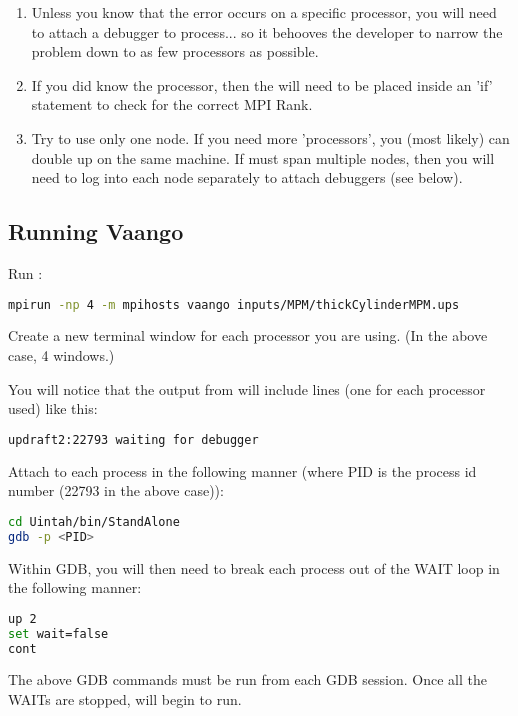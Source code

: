 \begin{enumerate}
 \item  Unless you know that the error occurs on a specific processor, you will need to attach a debugger to 
process... so it behooves the developer to narrow the problem down to
as few processors as possible.

 \item  If you did know the processor, then the  will
need to be placed inside an 'if' statement to check for the correct
MPI Rank.

 \item  Try to use only one node.  If you need more 'processors', you (most
likely) can double up on the same machine.  If  must span multiple
nodes, then you will need to log into each node separately to attach
debuggers (see below).
\end{enumerate}

\subsection{Running Vaango}

Run :

\begin{lstlisting}[language=sh,backgroundcolor=\color{background}]
mpirun -np 4 -m mpihosts vaango inputs/MPM/thickCylinderMPM.ups
\end{lstlisting}

Create a new terminal window for each processor you are using.  (In
the above case, 4 windows.)  

You will notice that the output from  will include lines (one for
each processor used) like this:

\begin{lstlisting}[language=sh,backgroundcolor=\color{background}]
updraft2:22793 waiting for debugger
\end{lstlisting}

Attach to each process in the following manner (where PID is the
process id number (22793 in the above case)):

\begin{lstlisting}[language=sh,backgroundcolor=\color{background}]
cd Uintah/bin/StandAlone
gdb -p <PID>
\end{lstlisting}

Within GDB, you will then need to break each process out of the WAIT loop in the
following manner:

\begin{lstlisting}[language=sh,backgroundcolor=\color{background}]
up 2
set wait=false
cont
\end{lstlisting}

The above GDB commands must be run from each GDB session.  Once all
the WAITs are stopped,  will begin to run.



